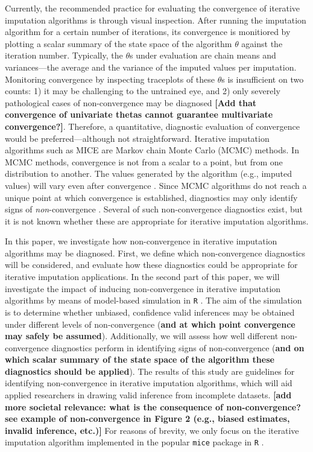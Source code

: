 \documentclass[Royal,times,sageh]{sagej}
\begin{document}
Currently, the recommended practice for evaluating the convergence of iterative imputation algorithms is through visual inspection. After running the imputation algorithm for a certain number of iterations, its convergence is monitiored by plotting a scalar summary of the state space of the algorithm \(\theta\) against the iteration number. Typically, the \(\theta\)s under evaluation are chain means and variances---the average and the variance of the imputed values per imputation. Monitoring convergence by inspecting traceplots of these \(\theta\)s is insufficient on two counts: 1) it may be challenging to the untrained eye, and 2) only severely pathological cases of non-convergence may be diagnosed \citep[\(\S\) 6.5.2]{buur18} \textbf{{[}Add that convergence of univariate thetas cannot guarantee multivariate convergence?{]}}. Therefore, a quantitative, diagnostic evaluation of convergence would be preferred---although not straightforward. Iterative imputation algorithms such as MICE are Markov chain Monte Carlo (MCMC) methods. In MCMC methods, convergence is not from a scalar to a point, but from one distribution to another. The values generated by the algorithm (e.g., imputed values) will vary even after convergence \citep{gelm13}. Since MCMC algorithms do not reach a unique point at which convergence is established, diagnostics may only identify signs of \emph{non}-convergence \citep{hoff09}. Several of such non-convergence diagnostics exist, but it is not known whether these are appropriate for iterative imputation algorithms.

In this paper, we investigate how non-convergence in iterative imputation algorithms may be diagnosed. First, we define which non-convergence diagnostics will be considered, and evaluate how these diagnostics could be appropriate for iterative imputation applications. In the second part of this paper, we will investigate the impact of inducing non-convergence in iterative imputation algorithms by means of model-based simulation in \texttt{R} \citep{R}. The aim of the simulation is to determine whether unbiased, confidence valid inferences may be obtained under different levels of non-convergence (\textbf{and at which point convergence may safely be assumed}). Additionally, we will assess how well different non-convergence diagnostics perform in identifying signs of non-convergence (\textbf{and on which scalar summary of the state space of the algorithm these diagnostics should be applied}). The results of this study are guidelines for identifying non-convergence in iterative imputation algorithms, which will aid applied researchers in drawing valid inference from incomplete datasets. \textbf{{[}add more societal relevance: what is the consequence of non-convergence? see example of non-convergence in Figure 2 (e.g., biased estimates, invalid inference, etc.){]}} For reasons of brevity, we only focus on the iterative imputation algorithm implemented in the popular \texttt{mice} package \citep{mice} in \texttt{R} \citep{R}.
\end{document}
